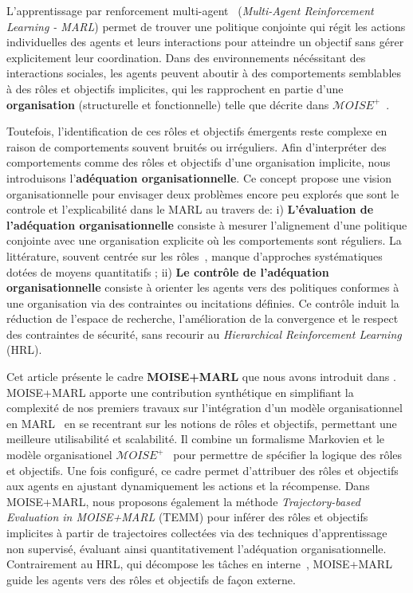 \documentclass[dissemination]{jfsma}
\begin{document}
L'apprentissage par renforcement multi-agent~\cite{maisonhaute2024} (\textit{Multi-Agent Reinforcement Learning - MARL}) permet de trouver une politique conjointe qui régit les actions individuelles des agents et leurs interactions pour atteindre un objectif sans gérer explicitement leur coordination. Dans des environnements nécéssitant des interactions sociales, les agents peuvent aboutir à des comportements semblables à des rôles et objectifs implicites, qui les rapprochent en partie d'une \textbf{organisation} (structurelle et fonctionnelle) telle que décrite dans $\mathcal{M}OISE^+$~\cite{Hubner2007}.


Toutefois, l’identification de ces rôles et objectifs émergents reste complexe en raison de comportements souvent bruités ou irréguliers. Afin d’interpréter des comportements comme des rôles et objectifs d'une organisation implicite, nous introduisons l’\textbf{adéquation organisationnelle}.
Ce concept propose une vision organisationnelle pour envisager deux problèmes encore peu explorés que sont le controle et l'explicabilité dans le MARL au travers de:
i) \textbf{L'évaluation de l'adéquation organisationnelle} consiste à mesurer l'alignement d'une politique conjointe avec une organisation explicite où les comportements sont réguliers. La littérature, souvent centrée sur les rôles~\cite{Isakov2024, Wen2024, Xie2024}, manque d'approches systématiques dotées de moyens quantitatifs
 ; \quad
ii) \textbf{Le contrôle de l'adéquation organisationnelle} consiste à orienter les agents vers des politiques conformes à une organisation via des contraintes ou incitations définies. Ce contrôle induit la réduction de l'espace de recherche, l'amélioration de la convergence et le respect des contraintes de sécurité, sans recourir au \textit{Hierarchical Reinforcement Learning} (HRL).


\noindent Cet article présente le cadre \textbf{MOISE+MARL} que nous avons introduit dans \cite{soule2025moisemarl}. MOISE+MARL apporte une contribution synthétique en simplifiant la complexité de nos premiers travaux sur l'intégration d'un modèle organisationnel en MARL~\cite{soule2024paper-jfsma, soule2024aomea} en se recentrant sur les notions de rôles et objectifs, permettant une meilleure utilisabilité et scalabilité. Il combine un formalisme Markovien et le modèle organisationel $\mathcal{M}OISE^+$~\cite{Hubner2007} pour permettre de spécifier la logique des rôles et objectifs. Une fois configuré, ce cadre permet d'attribuer des rôles et objectifs aux agents en ajustant dynamiquement les actions et la récompense. Dans MOISE+MARL, nous proposons également la méthode \textit{Trajectory-based Evaluation in MOISE+MARL} (TEMM) pour inférer des rôles et objectifs implicites à partir de trajectoires collectées via des techniques d'apprentissage non supervisé, évaluant ainsi quantitativement l'adéquation organisationnelle. Contrairement au HRL, qui décompose les tâches en interne~\cite{Qi2024, Matsuyama2025, SaoMai2024}, MOISE+MARL guide les agents vers des rôles et objectifs de façon externe.
\end{document}
